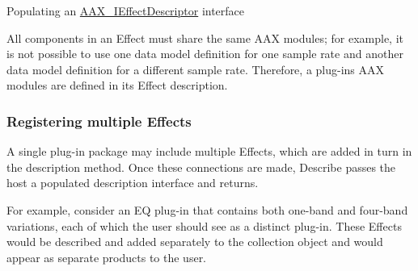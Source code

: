  Populating an \hyperlink{a00096}{A\+A\+X\+\_\+\+I\+Effect\+Descriptor} interface

 All components in an Effect must share the same A\+A\+X modules; for example, it is not possible to use one data model definition for one sample rate and another data model definition for a different sample rate. Therefore, a plug-\/in\textquotesingle{}s A\+A\+X modules are defined in its Effect description.

\hypertarget{a00326_describe_effects_multiple}{}\subsubsection{Registering multiple Effects}\label{a00326_describe_effects_multiple}
 A single plug-\/in package may include multiple Effects, which are added in turn in the description method. Once these connections are made, Describe passes the host a populated description interface and returns.

 For example, consider an E\+Q plug-\/in that contains both one-\/band and four-\/band variations, each of which the user should see as a distinct plug-\/in. These Effects would be described and added separately to the collection object and would appear as separate products to the user.


